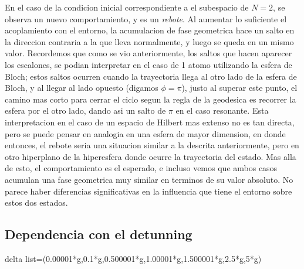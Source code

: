 En el caso de la condicion inicial correspondiente a el subespacio de $N=2$, se observa un nuevo comportamiento, y es un \textit{rebote}. Al aumentar lo suficiente el acoplamiento con el entorno, la acumulacion de fase geometrica hace un salto en la direccion contraria a la que lleva normalmente, y luego se queda en un mismo valor. Recordemos que como se vio anteriormente, los saltos que hacen aparecer los escalones, se podian interpretar en el caso de 1 atomo utilizando la esfera de Bloch; estos saltos ocurren cuando la trayectoria llega al otro lado de la esfera de Bloch, y al llegar al lado opuesto (digamos $\phi=\pi$), justo al superar este punto, el camino mas corto para cerrar el ciclo segun la regla de la geodesica es recorrer la esfera por el otro lado, dando asi un salto de $\pi$ en el caso resonante. Esta interpretacion en el caso de un espacio de Hilbert mas extenso no es tan directa, pero se puede pensar en analogia en una esfera de mayor dimension, en donde entonces, el rebote seria una situacion similar a la descrita anteriormente, pero en otro hiperplano de la hiperesfera donde ocurre la trayectoria del estado. Mas alla de esto, el comportamiento es el esperado, e incluso vemos que ambos casos acumulan una fase geometrica muy similar en terminos de su valor absoluto. No parece haber diferencias significativas en la influencia que tiene el entorno sobre estos dos estados.
\subsection{Dependencia con el detunning}
delta list=(0.00001*g,0.1*g,0.500001*g,1.00001*g,1.500001*g,2.5*g,5*g)


